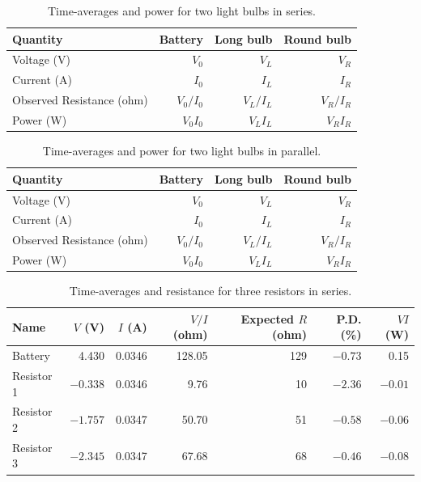%
\begin{table}[ht]
	\begin{center}
		\begin{tabular}{l|r|r|r}
            \textbf{Quantity} & \textbf{Battery} & \textbf{Long bulb} & \textbf{Round bulb} \\
            \hline
            Voltage (V) & $V_{0}$ & $V_{L}$ & $V_{R}$ \\
            Current (A) & $I_{0}$ & $I_{L}$ & $I_{R}$ \\
            \hline
            Observed Resistance (ohm) & $V_{0} / I_{0}$ & $V_{L} / I_{L}$ & $V_{R} / I_{R}$ \\
            Power (W) & $V_{0} I_{0}$ & $V_{L} I_{L}$ & $V_{R} I_{R}$ \\
            \hline
        \end{tabular}
	\end{center}
	\caption{Time-averages and power for two light bulbs in series.}
	\label{table.03.bulbs.series}
\end{table}
%
\begin{table}[ht]
	\begin{center}
		\begin{tabular}{l|r|r|r}
            \textbf{Quantity} & \textbf{Battery} & \textbf{Long bulb} & \textbf{Round bulb} \\
            \hline
            Voltage (V) & $V_{0}$ & $V_{L}$ & $V_{R}$ \\
            Current (A) & $I_{0}$ & $I_{L}$ & $I_{R}$ \\
            \hline
            Observed Resistance (ohm) & $V_{0} / I_{0}$ & $V_{L} / I_{L}$ & $V_{R} / I_{R}$ \\
            Power (W) & $V_{0} I_{0}$ & $V_{L} I_{L}$ & $V_{R} I_{R}$ \\
            \hline
        \end{tabular}
	\end{center}
	\caption{Time-averages and power for two light bulbs in parallel.}
	\label{table.03.bulbs.parallel}
\end{table}
%
\begin{table}[ht]
	\begin{center}
		\begin{tabular}{|l|r|r|r|r|r|r|}
			\hline
			Name & $V$ (V) & $I$ (A) & $V/I$ (ohm) & Expected $R$ (ohm) & P.D. (\%) & $V I$ (W) \\
			\hline
			Battery & 4.430 & 0.0346 & 128.05 & 129 & $-0.73$ & 0.15 \\
			Resistor 1 & $-0.338$ & 0.0346 & 9.76 & 10 & $-2.36$ & $-0.01$ \\
			Resistor 2 & $-1.757$ & 0.0347 & 50.70 & 51 & $-0.58$ & $-0.06$ \\
			Resistor 3 & $-2.345$ & 0.0347 & 67.68 & 68 & $-0.46$ & $-0.08$ \\
			\hline
		\end{tabular}
	\end{center}
	\caption{Time-averages and resistance for three resistors in series.}
	\label{table.03.3resistors.series}
\end{table}
